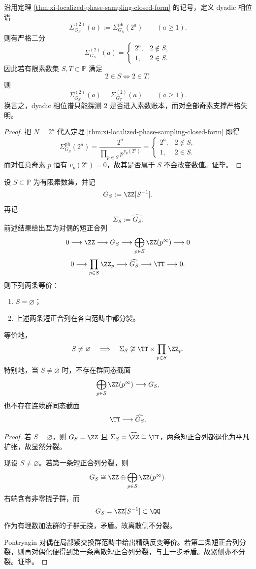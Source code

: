 \begin{corollary}\label{cor:xi-localized-dyadic-phase-blindness}
沿用定理 \ref{thm:xi-localized-phase-sampling-closed-form} 的记号，定义 dyadic 相位谱
\[
\Sigma^{(2)}_{G_S}(a):=\Sigma^{\mathrm{ph}}_{G_S}(2^a)
\qquad(a\ge 1).
\]
则有严格二分
\[
\boxed{\;
\Sigma^{(2)}_{G_S}(a)=
\begin{cases}
2^a,& 2\notin S,\\[1mm]
1,& 2\in S.
\end{cases}\;}
\]
因此若有限素数集 \(S,T\subset\mathbb P\) 满足
\[
2\in S \iff 2\in T,
\]
则
\[
\Sigma^{(2)}_{G_S}(a)=\Sigma^{(2)}_{G_T}(a)
\qquad(a\ge 1).
\]
换言之，dyadic 相位谱只能探测 \(2\) 是否进入素数账本，而对全部奇素支撑严格失明。
\end{corollary}
\begin{proof}
把 \(N=2^a\) 代入定理 \ref{thm:xi-localized-phase-sampling-closed-form} 即得
\[
\Sigma^{\mathrm{ph}}_{G_S}(2^a)
=
\frac{2^a}{\prod_{p\in S}p^{v_p(2^a)}}
=
\begin{cases}
2^a,& 2\notin S,\\[1mm]
1,& 2\in S.
\end{cases}
\]
而对任意奇素 \(p\) 恒有 \(v_p(2^a)=0\)，故其是否属于 \(S\) 不会改变数值。证毕。
\end{proof}

\begin{theorem}[局部化数系对偶短正合列的分裂判据]\label{thm:xi-localized-basic-extension-strictly-nonsplit}
设 \(S\subset\mathbb P\) 为有限素数集，并记
\[
G_S:=\ZZ[S^{-1}].
\]
再记
\[
\Sigma_S:=\widehat{G_S}.
\]
前述结果给出互为对偶的短正合列
\[
0\longrightarrow \ZZ\longrightarrow G_S\longrightarrow \bigoplus_{p\in S}\ZZ(p^\infty)\longrightarrow 0
\]
\[
0\longrightarrow \prod_{p\in S}\ZZ_p\longrightarrow \widehat{G_S}\longrightarrow \TT\longrightarrow 0.
\]
则下列两条等价：
\begin{enumerate}
  \item \(S=\varnothing\)；
  \item 上述两条短正合列在各自范畴中都分裂。
\end{enumerate}
等价地，
\[
S\neq\varnothing
\quad\Longrightarrow\quad
\Sigma_S\not\cong \TT\times \prod_{p\in S}\ZZ_p.
\]
特别地，当 \(S\neq\varnothing\) 时，不存在群同态截面
\[
\bigoplus_{p\in S}\ZZ(p^\infty)\longrightarrow G_S,
\]
也不存在连续群同态截面
\[
\TT\longrightarrow \widehat{G_S}.
\]
\end{theorem}
\begin{proof}
若 \(S=\varnothing\)，则 \(G_S=\ZZ\) 且 \(\Sigma_S=\widehat{\ZZ}\cong \TT\)，两条短正合列都退化为平凡扩张，故显然分裂。

现设 \(S\neq\varnothing\)。若第一条短正合列分裂，则
\[
G_S\cong \ZZ\oplus \bigoplus_{p\in S}\ZZ(p^\infty).
\]
右端含有非零挠子群，而
\[
G_S=\ZZ[S^{-1}]\subset \QQ
\]
作为有理数加法群的子群无挠，矛盾。故离散侧不分裂。

Pontryagin 对偶在局部紧交换群范畴中给出精确反变等价。若第二条短正合列分裂，则再对偶化便得到第一条离散短正合列分裂，与上一步矛盾。故紧侧亦不分裂。证毕。
\end{proof}

